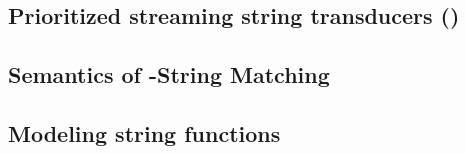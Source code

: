 %
%
%


\subsection{Prioritized streaming string transducers (\PSST)}





\subsection{Semantics of \regexp-String Matching} \label{sect:regextopsst}





\subsection{Modeling string functions}


